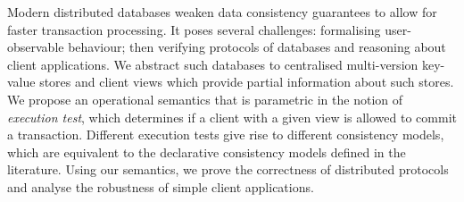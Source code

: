 Modern distributed databases weaken  data consistency guarantees 
to allow for faster transaction processing. 
It poses several challenges: formalising user-observable behaviour;
then verifying protocols of databases and reasoning about client applications.
We abstract such databases to centralised multi-version key-value
stores
and 
client views which provide partial  information about such stores. 
We propose an operational semantics that is parametric in the notion
of {\em execution test}, 
which determines if a client with a given view is allowed to commit a
transaction. Different execution tests give rise to 
different consistency models, which are equivalent to the
declarative consistency models defined in the literature. 
Using our semantics, we prove the correctness of distributed
protocols and analyse the robustness of simple client applications. 